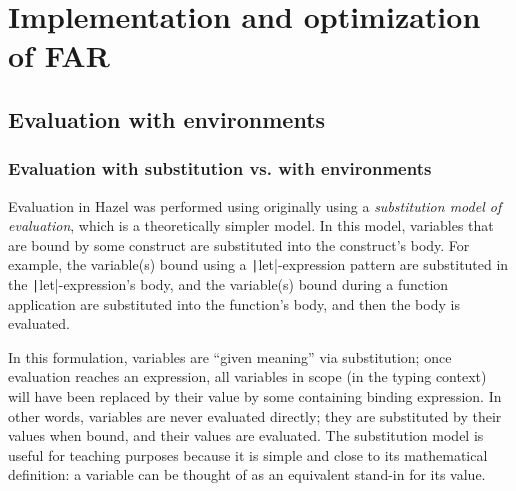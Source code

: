 \section{Implementation and optimization of FAR}
\label{sec:far_impl}

\subsection{Evaluation with environments}
\label{sec:eval_with_envs}

\subsubsection{Evaluation with substitution vs. with environments}
\label{sec:eval_sub_vs_env}



Evaluation in Hazel was performed using originally using a \textit{substitution model of evaluation}, which is a theoretically simpler model. In this model, variables that are bound by some construct are substituted into the construct's body. For example, the variable(s) bound using a \texttt|let|-expression pattern are substituted in the \texttt|let|-expression's body, and the variable(s) bound during a function application are substituted into the function's body, and then the body is evaluated.


In this formulation, variables are ``given meaning'' via substitution; once evaluation reaches an expression, all variables in scope (in the typing context) will have been replaced by their value by some containing binding expression. In other words, variables are never evaluated directly; they are substituted by their values when bound, and their values are evaluated. The substitution model is useful for teaching purposes because it is simple and close to its mathematical definition: a variable can be thought of as an equivalent stand-in for its value.

